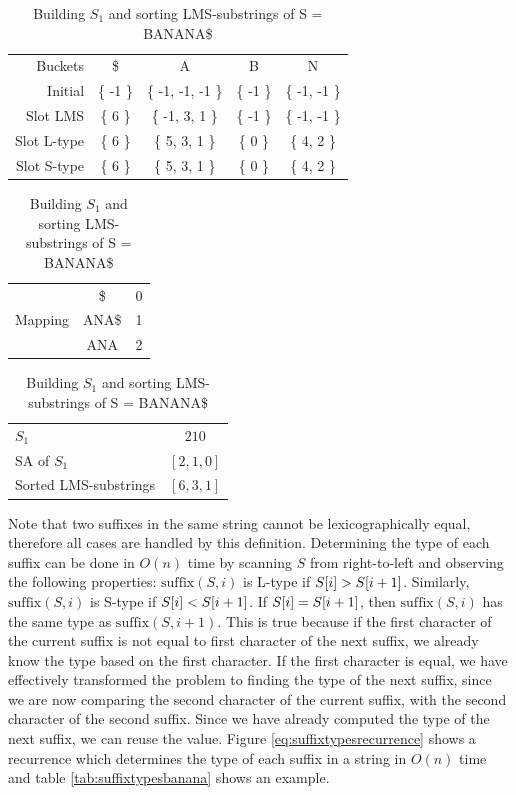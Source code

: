 \begin{table}[t]
    \begin{center}
        \begin{tabular}[c]{r|cccc}
            Buckets & \$ & A & B & N\\
            Initial & \{ -1 \} & \{ -1, -1, -1 \} & \{ -1 \} & \{ -1, -1 \}\\
            Slot LMS & \{  6 \} & \{ -1,  3,  1 \} & \{ -1 \} & \{ -1, -1 \}\\
            Slot L-type & \{  6 \} & \{  5,  3,  1 \} & \{  0 \} & \{  4,  2 \}\\
            Slot S-type & \{  6 \} & \{  5,  3,  1 \} & \{  0 \} & \{  4,  2 \}\\
        \end{tabular}

        \vspace{0.5cm}
        \begin{tabular}[c]{r|c|c}
                    & \$ & 0 \\
            Mapping & ANA\$ & 1 \\
                    & ANA & 2 \\
        \end{tabular}

        \vspace{0.5cm}

        \begin{tabular}[c]{l|c}
                    $S_1$ & $210$ \\
                    SA of $S_1$ & $[2, 1, 0]$ \\
                    Sorted LMS-substrings & $[6, 3, 1]$ \\
        \end{tabular}

    \end{center}
    \caption{Building $S_1$ and sorting LMS-substrings of S = BANANA\$}
    \label{tab:bucketinglms}
\end{table}


Note that two suffixes in the same string cannot be lexicographically equal, therefore all
cases are handled by this definition. Determining the type of each suffix can be done in
$O(n)$ time by scanning $S$ from right-to-left and observing the following properties:
$\mathrm{suffix}(S, i)$ is L-type if $S[{i}] > S[{i + 1}]$.
Similarly, $\mathrm{suffix}(S, i)$ is S-type if $S[{i}] < S[{i +
1}]$. If $S[{i}] = S[{i + 1}]$, then $\mathrm{suffix}(S, i)$ has
the same type as $\mathrm{suffix}(S, i + 1)$. This is true because if the first character
of the current suffix is not equal to first character of the next suffix, we already know
the type based on the first character. If the first character is equal, we have
effectively transformed the problem to finding the type of the next suffix, since we are
now comparing the second character of the current suffix, with the second character of the
second suffix. Since we have already computed the type of the next suffix, we can reuse
the value. Figure \ref{eq:suffixtypesrecurrence} shows a recurrence which determines the
type of each suffix in a string in $O(n)$ time and table \ref{tab:suffixtypesbanana} shows
an example.

